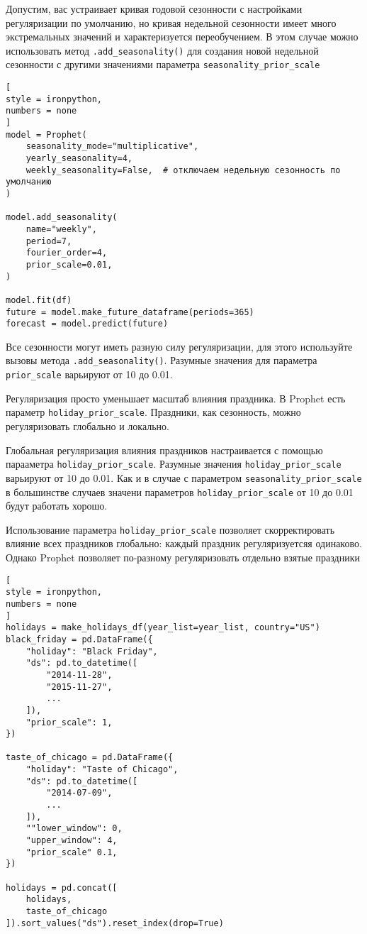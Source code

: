 \documentclass[%
	11pt,
	a4paper,
	utf8,
		]{article}
\begin{document}
Допустим, вас устраивает кривая годовой сезонности с настройками регуляризации по умолчанию, но кривая недельной сезонности имеет много экстремальных значений и характеризуется переобучением. В этом случае можно использовать метод \verb|.add_seasonality()| для создания новой недельной сезонности с другими значениями параметра \verb|seasonality_prior_scale|
\begin{lstlisting}[
style = ironpython,
numbers = none
]
model = Prophet(
    seasonality_mode="multiplicative",
    yearly_seasonality=4,
    weekly_seasonality=False,  # отключаем недельную сезонность по умолчанию
)

model.add_seasonality(
    name="weekly",
    period=7,
    fourier_order=4,
    prior_scale=0.01,
)

model.fit(df)
future = model.make_future_dataframe(periods=365)
forecast = model.predict(future)
\end{lstlisting}

Все сезонности могут иметь разную силу регуляризации, для этого используйте вызовы метода \verb|.add_seasonality()|. Разумные значения для параметра \verb|prior_scale| варьируют от 10 до 0.01.

Регуляризация просто уменьшает масштаб влияния праздника. В Prophet есть параметр \verb|holiday_prior_scale|. Праздники, как сезонность, можно регуляризовать глобально и локально.

Глобальная регуляризация влияния праздников настраивается с помощью парааметра \verb|holiday_prior_scale|. Разумные значения \verb|holiday_prior_scale| варьируют от 10 до 0.01. Как и в случае с параметром \verb|seasonality_prior_scale| в большинстве случаев значени параметров \verb|holiday_prior_scale| от 10 до 0.01 будут работать хорошо. 

Использование параметра \verb|holiday_prior_scale| позволяет скорректировать влияние всех праздников глобально: каждый праздник регуляризуетсяя одинаково. Однако Prophet позволяет по-разному регуляризовать отдельно взятые праздники
\begin{lstlisting}[
style = ironpython,
numbers = none
]
holidays = make_holidays_df(year_list=year_list, country="US")
black_friday = pd.DataFrame({
    "holiday": "Black Friday",
    "ds": pd.to_datetime([
        "2014-11-28",
        "2015-11-27",
        ...
    ]),
    "prior_scale": 1,
})

taste_of_chicago = pd.DataFrame({
    "holiday": "Taste of Chicago",
    "ds": pd.to_datetime([
        "2014-07-09",
        ...
    ]),
    ""lower_window": 0,
    "upper_window": 4,
    "prior_scale" 0.1,
})

holidays = pd.concat([
    holidays,
    taste_of_chicago
]).sort_values("ds").reset_index(drop=True)
\end{lstlisting}
\end{document}
